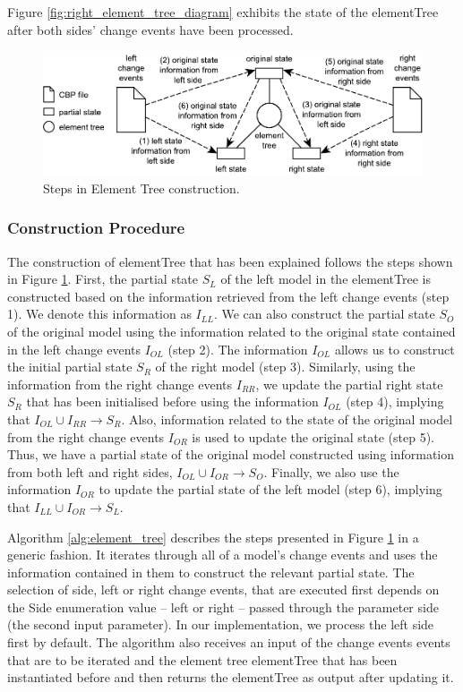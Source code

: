 Figure \ref{fig:right_element_tree_diagram} exhibits the state of the \textsf{elementTree} after both sides' change events have been processed.

\begin{figure}[]
\centering
\includegraphics[width=0.8\linewidth]{TreeConstruction}
\caption{Steps in Element Tree construction.}
\label{fig:tree_construction}
\end{figure} 

\subsubsection{Construction Procedure}\label{sec:construction_procedure}
The construction of \textsf{elementTree} that has been explained follows the steps shown in Figure \ref{fig:tree_construction}. First, the partial
state $S_{L}$ of the left model in the \textsf{elementTree} is constructed based on the information retrieved from the left change events (step 1). We denote this information as $I_{LL}$. We can also construct the partial 
state $S_{O}$ of the original model using the information related to the original state contained in the left change events $I_{OL}$ (step 2). The information $I_{OL}$ allows us to construct the initial partial 
state $S_{R}$ of the right model 
(step 3). Similarly, using the information from the right change events $I_{RR}$, we update the partial right state $S_{R}$ that has been initialised before using the information $I_{OL}$ (step 4), implying that $I_{OL} \cup I_{RR} \rightarrow S_{R}$. Also, information related to the state of the original model from the right change events $I_{OR}$ is used to update the original state  (step 5). Thus, we have a partial state of the original model constructed using information from both left and right sides, $I_{OL} \cup I_{OR} \rightarrow S_{O}$. Finally, we also use the information $I_{OR}$ to update the partial state of the left model (step 6), implying that $I_{LL} \cup I_{OR} \rightarrow S_{L}$.  

Algorithm \ref{alg:element_tree} describes the steps presented in Figure \ref{fig:tree_construction} in a generic fashion. It iterates through all of a model's change events and uses the information contained in them to construct the relevant partial state. The selection of side, left or right change events, that are executed first depends on the \textsf{Side} enumeration value -- \textsf{left} or \textsf{right} -- passed through the parameter \textsf{side} (the second input parameter). In our implementation, we process the left side first by default. The algorithm also receives an input of the change events \textsf{events} that are to be iterated and the element tree \textsf{elementTree} that has been instantiated before and then returns the \textsf{elementTree} as output after updating it.

